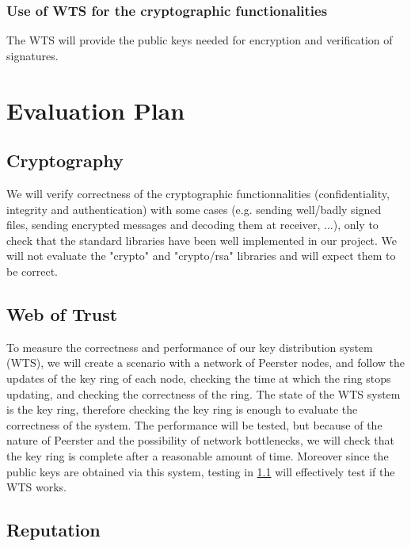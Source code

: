 \documentclass[]{article}
\begin{document}
\subsubsection{Use of WTS for the cryptographic functionalities}
The WTS will provide the public keys needed for encryption and verification of signatures.

\section{Evaluation Plan}

\subsection{Cryptography}
\label{sec:crypt-test}
We will verify correctness of the cryptographic functionnalities (confidentiality, integrity and authentication) with some cases (e.g. sending well/badly signed files, sending encrypted messages and decoding them at receiver, ...), only to check that the standard libraries have been well implemented in our project. We will not evaluate the "crypto" and "crypto/rsa" libraries and will expect them to be correct.

\subsection{Web of Trust}
To measure the correctness and performance of our key distribution system (WTS), we will create a scenario with a network of Peerster nodes, and follow the updates of the key ring of each node, checking the time at which the ring stops updating, and checking the correctness of the ring. The state of the WTS system is the key ring, therefore checking the key ring is enough to evaluate the correctness of the system. The performance will be tested, but because of the nature of Peerster and the possibility of network bottlenecks, we will check that the key ring is complete after a reasonable amount of time. Moreover since the public keys are obtained via this system, testing in \ref{sec:crypt-test} will effectively test if the WTS works.

\subsection{Reputation}


{}

\end{document}

